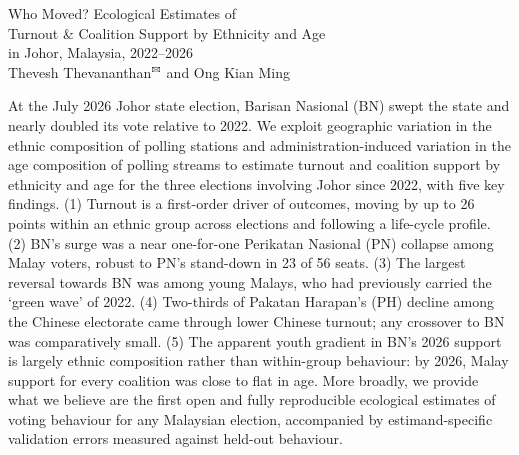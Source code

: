 \documentclass[11pt]{article}
\begin{document}

\begin{center}
	\begin{minipage}{0.9\linewidth}
		\begin{center}
			\LARGE
			Who Moved? Ecological Estimates of \\Turnout \& Coalition Support by Ethnicity and Age\\in Johor, Malaysia, 2022--2026\\[0.21in]
			\Large
			Thevesh Thevananthan\footnotemark$^{\text{\Letter}}$ and Ong Kian Ming\footnotemark\\[0.15in]
		\end{center}
		\large
		At the July 2026 Johor state election, Barisan Nasional (BN) swept the state and nearly doubled its vote relative to 2022. We exploit geographic variation in the ethnic composition of polling stations and administration-induced variation in the age composition of polling streams to estimate turnout and coalition support by ethnicity and age for the three elections involving Johor since 2022, with five key findings. (1) Turnout is a first-order driver of outcomes, moving by up to 26 points within an ethnic group across elections and following a life-cycle profile. (2) BN's surge was a near one-for-one Perikatan Nasional (PN) collapse among Malay voters, robust to PN's stand-down in 23 of 56 seats. (3) The largest reversal towards BN was among young Malays, who had previously carried the `green wave' of 2022. (4) Two-thirds of Pakatan Harapan's (PH) decline among the Chinese electorate came through lower Chinese turnout; any crossover to BN was comparatively small. (5) The apparent youth gradient in BN's 2026 support is largely ethnic composition rather than within-group behaviour: by 2026, Malay support for every coalition was close to flat in age. More broadly, we provide what we believe are the first open and fully reproducible ecological estimates of voting behaviour for any Malaysian election, accompanied by estimand-specific validation errors measured against held-out behaviour.
	\end{minipage}
\end{center}


\newpage
{}
\end{document}
